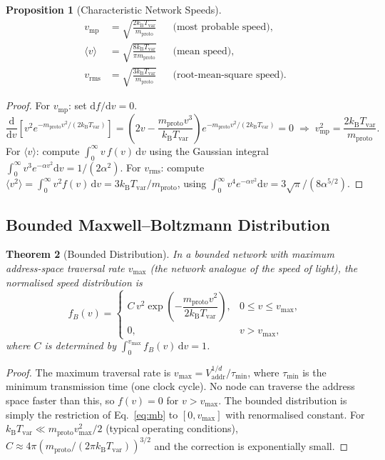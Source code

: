 \documentclass[11pt,twocolumn,a4paper]{article}
\newtheorem{theorem}{Theorem}[section]
\newtheorem{proposition}[theorem]{Proposition}
\theoremstyle{definition}
\theoremstyle{remark}
\newcommand{\kB}{k_{\mathrm{B}}}
\newcommand{\Tvar}{T_{\mathrm{var}}}
\newcommand{\Vaddr}{V_{\mathrm{addr}}}
\newcommand{\mpr}{m_{\mathrm{proto}}}
\newcommand{\dd}{\mathrm{d}}
\newcommand{\avg}[1]{\langle #1 \rangle}
\begin{document}
\begin{proposition}[Characteristic Network Speeds]\label{prop:speeds}
\begin{align}
  v_{\mathrm{mp}} &= \sqrt{\frac{2\kB\Tvar}{\mpr}}
  &&\text{(most probable speed)}, \label{eq:vmp}\\
  \avg{v} &= \sqrt{\frac{8\kB\Tvar}{\pi\mpr}}
  &&\text{(mean speed)}, \label{eq:vmean}\\
  v_{\mathrm{rms}} &= \sqrt{\frac{3\kB\Tvar}{\mpr}}
  &&\text{(root-mean-square speed)}. \label{eq:vrms}
\end{align}
\end{proposition}

\begin{proof}
For $v_{\mathrm{mp}}$: set $\dd f/\dd v=0$.
\[
  \frac{\dd}{\dd v}\left[v^2 e^{-\mpr v^2/(2\kB\Tvar)}\right]
  = \left(2v - \frac{\mpr v^3}{\kB\Tvar}\right)e^{-\mpr v^2/(2\kB\Tvar)}=0
  \;\Rightarrow\; v_{\mathrm{mp}}^2 = \frac{2\kB\Tvar}{\mpr}.
\]
For $\avg{v}$: compute $\int_0^{\infty}v\,f(v)\,\dd v$ using the Gaussian
integral $\int_0^{\infty}v^3 e^{-\alpha v^2}\dd v=1/(2\alpha^2)$.
For $v_{\mathrm{rms}}$: compute
$\avg{v^2}=\int_0^{\infty}v^2 f(v)\,\dd v = 3\kB\Tvar/\mpr$, using
$\int_0^{\infty}v^4 e^{-\alpha v^2}\dd v=3\sqrt{\pi}/(8\alpha^{5/2})$.
\end{proof}

\subsection{Bounded Maxwell--Boltzmann Distribution}\label{sec:bounded_mb}

\begin{theorem}[Bounded Distribution]\label{thm:bounded_mb}
In a bounded network with maximum address-space traversal rate $v_{\max}$
(the network analogue of the speed of light), the normalised speed
distribution is
\begin{equation}\label{eq:bounded_mb}
  f_B(v) = \begin{cases}
    C\,v^2\exp\!\left(-\dfrac{\mpr v^2}{2\kB\Tvar}\right),
    & 0\leq v\leq v_{\max},\\[6pt]
    0, & v>v_{\max},
  \end{cases}
\end{equation}
where $C$ is determined by $\int_0^{v_{\max}}f_B(v)\,\dd v=1$.
\end{theorem}

\begin{proof}
The maximum traversal rate is $v_{\max}=\Vaddr^{1/d}/\tau_{\min}$, where
$\tau_{\min}$ is the minimum transmission time (one clock cycle).  No node
can traverse the address space faster than this, so $f(v)=0$ for
$v>v_{\max}$.  The bounded distribution is simply the restriction of
Eq.~\eqref{eq:mb} to $[0,v_{\max}]$ with renormalised constant.  For
$\kB\Tvar\ll\mpr v_{\max}^2/2$ (typical operating conditions),
$C\approx 4\pi(\mpr/(2\pi\kB\Tvar))^{3/2}$ and the correction is
exponentially small.
\end{proof}
\end{document}
